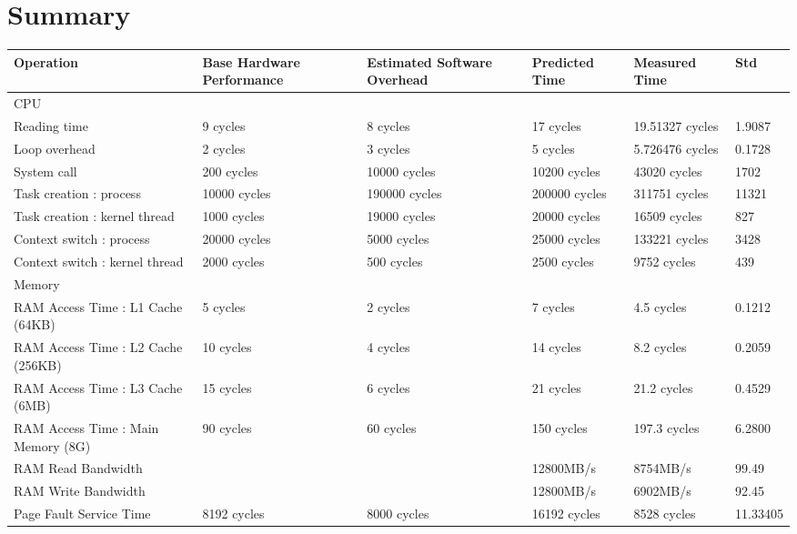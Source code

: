 \chapter{Summary}

\small
\begin{center}
\begin{tabular}{| p{4cm} | p{2cm} | p{2cm} | p{2cm} | p{2.5cm} | p{2cm} }
\hline
Operation  & Base Hardware Performance  & Estimated Software Overhead  & Predicted Time  & Measured Time  & Std \\
\hline 
CPU & & & & &\\
\hline
Reading time & 9 cycles & 8 cycles & 17 cycles & 19.51327 cycles & 1.9087\\
Loop overhead & 2 cycles& 3 cycles& 5 cycles& 5.726476 cycles & 0.1728 \\
System call & 200 cycles& 10000 cycles& 10200 cycles& 43020 cycles & 1702 \\
Task creation : process & 10000 cycles& 190000 cycles& 200000 cycles& 311751 cycles & 11321\\
Task creation : kernel thread    & 1000 cycles& 19000 cycles& 20000 cycles& 16509 cycles & 827\\
Context switch : process & 20000 cycles& 5000 cycles& 25000 cycles& 133221  cycles & 3428\\
Context switch : kernel thread    & 2000 cycles& 500 cycles& 2500 cycles& 9752 cycles & 439\\
\hline 
Memory & & & & &\\
\hline
RAM Access Time : L1 Cache (64KB) &   5 cycles  & 2 cycles & 7 cycles &  4.5 cycles & 0.1212 \\
RAM Access Time : L2 Cache (256KB) & 10 cycles & 4 cycles & 14 cycles &  8.2 cycles & 0.2059\\
RAM Access Time : L3 Cache (6MB) & 15 cycles & 6 cycles & 21 cycles  & 21.2 cycles & 0.4529\\
RAM Access Time : Main Memory (8G) & 90 cycles & 60 cycles & 150 cycles & 197.3 cycles & 6.2800\\
RAM Read Bandwidth & & & 12800MB/s & 8754MB/s & 99.49 \\
RAM Write Bandwidth & & & 12800MB/s & 6902MB/s & 92.45\\
Page Fault Service Time & 8192 cycles& 8000 cycles& 16192 cycles& 8528 cycles & 11.33405\\
\end{tabular}
\end{center}



